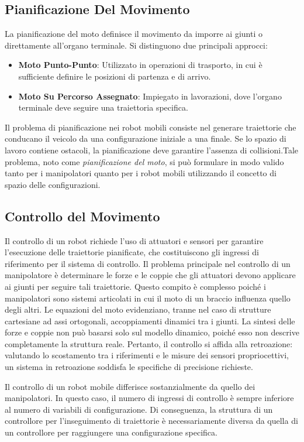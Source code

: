 ﻿\documentclass[11pt, a4paper]{article}
\begin{document}
\subsection{Pianificazione Del Movimento}
La pianificazione del moto definisce il movimento da imporre ai giunti o direttamente all'organo terminale. Si distinguono due principali approcci:
\begin{itemize}
    \item \textbf{Moto Punto-Punto}: Utilizzato in operazioni di trasporto, in cui è sufficiente definire le posizioni di partenza e di arrivo.
    \item \textbf{Moto Su Percorso Assegnato}: Impiegato in lavorazioni, dove l'organo terminale deve seguire una traiettoria specifica.
\end{itemize}
Il problema di pianificazione nei robot mobili consiste nel generare traiettorie che conducano il veicolo da una configurazione iniziale a una finale. Se lo spazio di lavoro contiene ostacoli, la pianificazione deve garantire l'assenza di collisioni.Tale problema, noto come \textit{pianificazione del moto}, si può formulare in modo valido tanto per i manipolatori quanto per i robot mobili utilizzando il concetto di spazio delle configurazioni.

\newpage

\subsection{Controllo del Movimento}
Il controllo di un robot richiede l'uso di attuatori e sensori per garantire l'esecuzione delle traiettorie pianificate, che costituiscono gli ingressi di riferimento per il sistema di controllo. Il problema principale nel controllo di un manipolatore è determinare le forze e le coppie che gli attuatori devono applicare ai giunti per seguire tali traiettorie. Questo compito è complesso poiché i manipolatori sono sistemi articolati in cui il moto di un braccio influenza quello degli altri. Le equazioni del moto evidenziano, tranne nel caso di strutture cartesiane ad assi ortogonali, accoppiamenti dinamici tra i giunti. La sintesi delle forze e coppie non può basarsi solo sul modello dinamico, poiché esso non descrive completamente la struttura reale. Pertanto, il controllo si affida alla retroazione: valutando lo scostamento tra i riferimenti e le misure dei sensori propriocettivi, un sistema in retroazione soddisfa le specifiche di precisione richieste.

Il controllo di un robot mobile differisce sostanzialmente da quello dei manipolatori. In questo caso, il numero di ingressi di controllo è sempre inferiore al numero di variabili di configurazione. Di conseguenza, la struttura di un controllore per l'inseguimento di traiettorie è necessariamente diversa da quella di un controllore per raggiungere una configurazione specifica.
\end{document}
